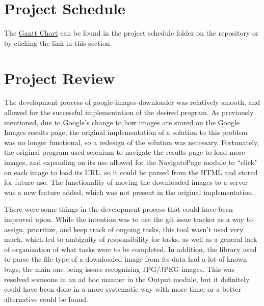 \documentclass{article}
\begin{document}
\section{Project Schedule}
The \href{https://gitlab.cas.mcmaster.ca/guinnesj/google-images-downloader/blob/master/ProjectSchedule/Gantt-Chart.pdf}{Gantt Chart} can be found in the project schedule folder on the repository or by clicking the link in this section.

\section{Project Review}
\color{red}The development process of google-images-downloader was relatively 
smooth, and allowed for the successful implementation of the desired program. 
As previously mentioned, due to Google's change to how images are stored on the 
Google Images results page, the original implementation of a solution to this 
problem was no longer functional, so a redesign of the solution was necessary. 
Fortunately, the original program used selenium to navigate the results page to  
load more images, and expanding on its use allowed for the NavigatePage module 
to ``click" on each image to load its URL, so it could be parsed from the HTML 
and stored for future use. The functionality of moving the downloaded images to 
a server was a new feature added, which was not present in the original 
implementation.

There were some things in the development process that could have been improved 
upon. While the intention was to use the git issue tracker as a way to assign, 
prioritize, and keep track of ongoing tasks, this tool wasn't used very much, 
which led to ambiguity of responsibility for tasks, as well as a general lack 
of organization of what tasks were to be completed. In addition, the library 
used to parse the file type of a downloaded image from its data had a lot of 
known bugs, the main one being issues recognizing JPG/JPEG images. This was 
resolved someone in an ad hoc manner in the Output module, but it definitely 
could have been done in a more systematic way with more time, or a better 
alternative could be found. \color{black}

\printbibliography{}
\end{document}
